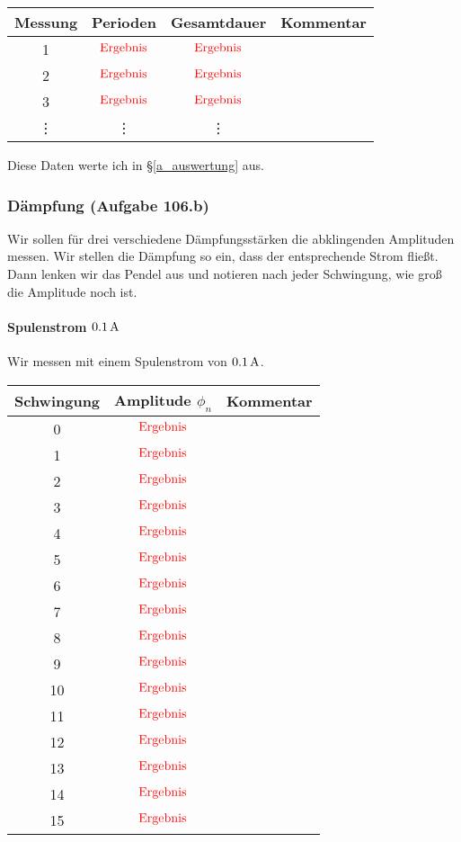 \documentclass[11pt]{article}
\newcommand{\ergebnis}{\textcolor{red}{\mathrm{Ergebnis}}}
\begin{document}
\begin{tabular}{cccr}
	Messung & Perioden & Gesamtdauer & Kommentar \\
	\hline
	1 & $\ergebnis$ & $\ergebnis$ \\
	2 & $\ergebnis$ & $\ergebnis$ \\
	3 & $\ergebnis$ & $\ergebnis$ \\
  \vdots & \vdots & \vdots \\
\end{tabular}

Diese Daten werte ich in §\ref{a_auswertung} aus.

\subsubsection{Dämpfung (Aufgabe 106.b)}
\label{b_durchführung}

Wir sollen für drei verschiedene Dämpfungsstärken die abklingenden Amplituden
messen. Wir stellen die Dämpfung so ein, dass der entsprechende Strom fließt.
Dann lenken wir das Pendel aus und notieren nach jeder Schwingung, wie groß die
Amplitude noch ist.

\paragraph{Spulenstrom $\unit[0.1] A$}

Wir messen mit einem Spulenstrom von $\unit[0.1] A$.

\begin{tabular}{ccr}
	Schwingung & Amplitude $\phi_n$ & Kommentar \\
	\hline
	0 & $\ergebnis$ \\
	1 & $\ergebnis$ \\
	2 & $\ergebnis$ \\
	3 & $\ergebnis$ \\
	4 & $\ergebnis$ \\
	5 & $\ergebnis$ \\
	6 & $\ergebnis$ \\
	7 & $\ergebnis$ \\
	8 & $\ergebnis$ \\
	9 & $\ergebnis$ \\
	10 & $\ergebnis$ \\
	11 & $\ergebnis$ \\
	12 & $\ergebnis$ \\
	13 & $\ergebnis$ \\
	14 & $\ergebnis$ \\
	15 & $\ergebnis$ \\
\end{tabular}
\end{document}
